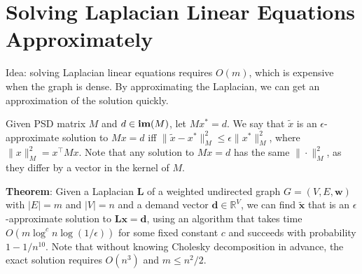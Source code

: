 \section{Solving Laplacian Linear Equations Approximately}

Idea: solving Laplacian linear equations requires $O(m)$, which is expensive when the graph is dense. By approximating the Laplacian, we can get an approximation of the solution quickly.

Given PSD matrix $M$ and $d \in \operatorname{\textbf{im}}(M)$, let $M x^* = d$. We say that $\tilde{x}$ is an $\epsilon$-approximate solution to $Mx=d$ iff $\|\tilde{x} - x^*\|_M^2 \le \epsilon \|x^*\|_M^2$, where $\|x\|_M^2 = x^\top M x$. Note that any solution to $M x = d$ has the same $\|\cdot\|_M^2$, as they differ by a vector in the kernel of $M$.

\textbf{Theorem}: Given a Laplacian $\boldsymbol{L}$ of a weighted undirected graph $G=(V, E, \boldsymbol{w})$ with $|E|=m$ and $|V|=n$ and a demand vector $\boldsymbol{d} \in \mathbb{R}^{V}$, we can find $\tilde{\boldsymbol{x}}$ that is an $\epsilon$-approximate solution to $\boldsymbol{L x}=\boldsymbol{d}$, using an algorithm that takes time $O\left(m \log ^{c} n \log (1 / \epsilon)\right)$ for some fixed constant $c$ and succeeds with probability $1-1 / n^{10}$. Note that without knowing Cholesky decomposition in advance, the exact solution requires $O(n^3)$ and $m \le n^2 / 2$.